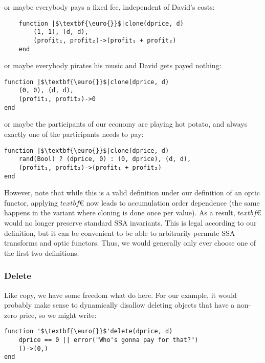\documentclass[letterpaper, 10 pt, conference]{ieeeconf}  %
\begin{document}
or maybe everybody pays a fixed fee, independent of David's costs:

\begin{verbatim}
    function |$\textbf{\euro{}}$|clone(dprice, d)
        (1, 1), (d, d),
        (profit₁, profit₂)->(profit₁ + profit₂)
    end
\end{verbatim}

or maybe everybody pirates his music and David gets payed nothing:

\begin{verbatim}
function |$\textbf{\euro{}}$|clone(dprice, d)
    (0, 0), (d, d),
    (profit₁, profit₂)->0
end
\end{verbatim}

or maybe the participants of our economy are playing hot potato, and always
exactly one of the participants needs to pay:

\begin{verbatim}
function |$\textbf{\euro{}}$|clone(dprice, d)
    rand(Bool) ? (dprice, 0) : (0, dprice), (d, d),
    (profit₁, profit₂)->(profit₁ + profit₂)
end
\end{verbatim}

However, note that while this is a valid definition under our definition of
an optic functor, applying $textbf{\euro{}}$ now leads to accumulation order
dependence (the same happens in the variant where cloning is done once per value).
As a result, $textbf{\euro{}}$ would no longer preserve standard SSA invariants.
This is legal according to our definition, but it can be convenient to be able to
arbitrarily permute SSA transforms and optic functors. Thus, we would generally
only ever choose one of the first two definitions.

\subsubsection{Delete}

Like copy, we have some freedom what do here. For our example, it would probably
make sense to dynamically disallow deleting objects that have a non-zero price,
so we might write:

\begin{verbatim}
function '$\textbf{\euro{}}$'delete(dprice, d)
    dprice == 0 || error("Who's gonna pay for that?")
    ()->(0,)
end
\end{verbatim}
\end{document}
